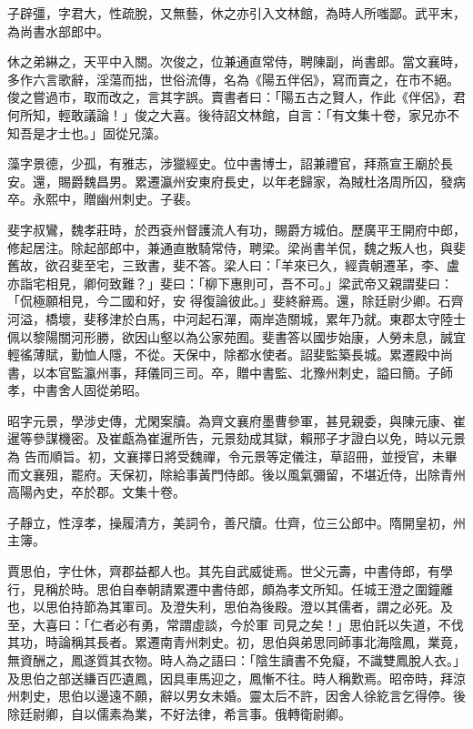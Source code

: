 \begin{pinyinscope}
 子辟彊，字君大，性疏脫，又無藝，休之亦引入文林館，為時人所嗤鄙。武平末，為尚書水部郎中。



 休之弟綝之，天平中入關。次俊之，位兼通直常侍，聘陳副，尚書郎。當文襄時，多作六言歌辭，淫蕩而拙，世俗流傳，名為《陽五伴侶》，寫而賣之，在市不絕。俊之嘗過市，取而改之，言其字誤。賣書者曰：「陽五古之賢人，作此《伴侶》，君何所知，輕敢議論！」俊之大喜。後待詔文林館，自言：「有文集十卷，家兄亦不知吾是才士也。」固從兄藻。



 藻字景德，少孤，有雅志，涉獵經史。位中書博士，詔兼禮官，拜燕宣王廟於長安。還，賜爵魏昌男。累遷瀛州安東府長史，以年老歸家，為賊杜洛周所囚，發病卒。永熙中，贈幽州刺史。子裴。



 斐字叔鸞，魏孝莊時，於西袞州督護流人有功，賜爵方城伯。歷廣平王開府中郎，修起居注。除起部郎中，兼通直散騎常侍，聘梁。梁尚書羊侃，魏之叛人也，與斐舊故，欲召斐至宅，三致書，斐不答。梁人曰：「羊來已久，經貴朝遷革，李、盧亦詣宅相見，卿何致難？」斐曰：「柳下惠則可，吾不可。」梁武帝又親謂斐曰：「侃極願相見，今二國和好，安
 得復論彼此。」斐終辭焉。還，除廷尉少卿。石齊河溢，橋壞，斐移津於白馬，中河起石潬，兩岸造關城，累年乃就。東郡太守陸士佩以黎陽關河形勝，欲因山壑以為公家苑囿。斐書答以國步始康，人勞未息，誠宜輕徭薄賦，勤恤人隱，不從。天保中，除都水使者。詔斐監築長城。累遷殿中尚書，以本官監瀛州事，拜儀同三司。卒，贈中書監、北豫州刺史，謚曰簡。子師孝，中書舍人固從弟昭。



 昭字元景，學涉史傳，尤閑案牘。為齊文襄府墨曹參軍，甚見親委，與陳元康、崔暹等參謀機密。及崔甗為崔暹所告，元景劾成其獄，賴邢子才證白以免，時以元景為
 告而順旨。初，文襄擇日將受魏禪，令元景等定儀注，草詔冊，並授官，未畢而文襄殂，罷府。天保初，除給事黃門侍郎。後以風氣彌留，不堪近侍，出除青州高陽內史，卒於郡。文集十卷。



 子靜立，性淳孝，操履清方，美詞令，善尺牘。仕齊，位三公郎中。隋開皇初，州主簿。



 賈思伯，字仕休，齊郡益都人也。其先自武威徙焉。世父元壽，中書侍郎，有學行，見稱於時。思伯自奉朝請累遷中書侍郎，頗為孝文所知。任城王澄之圍鐘離也，以思伯持節為其軍司。及澄失利，思伯為後殿。澄以其儒者，謂之必死。及至，大喜曰：「仁者必有勇，常謂虛談，今於軍
 司見之矣！」思伯託以失道，不伐其功，時論稱其長者。累遷南青州刺史。初，思伯與弟思同師事北海陰鳳，業竟，無資酬之，鳳遂質其衣物。時人為之語曰：「陰生讀書不免癡，不識雙鳳脫人衣。」及思伯之部送縑百匹遺鳳，因具車馬迎之，鳳慚不往。時人稱歎焉。昭帝時，拜涼州刺史，思伯以邊遠不願，辭以男女未婚。靈太后不許，因舍人徐紇言乞得停。後除廷尉卿，自以儒素為業，不好法律，希言事。俄轉衛尉卿。




\end{pinyinscope}
